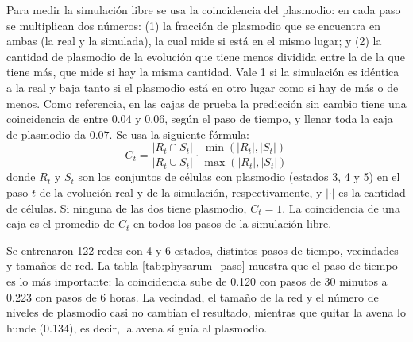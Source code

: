 Para medir la simulación libre se usa la coincidencia del plasmodio: en cada paso se multiplican dos números: (1) la fracción de plasmodio que se encuentra en ambas (la real y la simulada), la cual mide si está en el mismo lugar; y (2) la cantidad de plasmodio de la evolución que tiene menos dividida entre la de la que tiene más, que mide si hay la misma cantidad. Vale 1 si la simulación es idéntica a la real y baja tanto si el plasmodio está en otro lugar como si hay de más o de menos. Como referencia, en las cajas de prueba la predicción sin cambio tiene una coincidencia de entre $0.04$ y $0.06$, según el paso de tiempo, y llenar toda la caja de plasmodio da $0.07$. Se usa la siguiente fórmula:
\begin{equation*}
	C_t = \frac{|R_t \cap S_t|}{|R_t \cup S_t|} \cdot \frac{\min(|R_t|, |S_t|)}{\max(|R_t|, |S_t|)}
	\label{eq:physarum:coincidencia}
\end{equation*}
donde $R_t$ y $S_t$ son los conjuntos de células con plasmodio (estados 3, 4 y 5) en el paso $t$ de la evolución real y de la simulación, respectivamente, y $|\cdot|$ es la cantidad de células. Si ninguna de las dos tiene plasmodio, $C_t = 1$. La coincidencia de una caja es el promedio de $C_t$ en todos los pasos de la simulación libre.

Se entrenaron 122 redes con 4 y 6 estados, distintos pasos de tiempo, vecindades y tamaños de red. La tabla \ref{tab:physarum_paso} muestra que el paso de tiempo es lo más importante: la coincidencia sube de 0.120 con pasos de 30 minutos a 0.223 con pasos de 6 horas. La vecindad, el tamaño de la red y el número de niveles de plasmodio casi no cambian el resultado, mientras que quitar la avena lo hunde (0.134), es decir, la avena sí guía al plasmodio.

